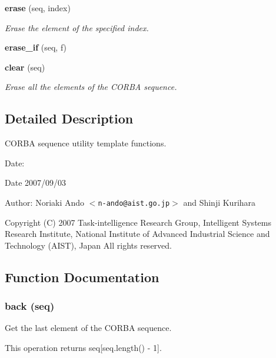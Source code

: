 \begin{CompactItemize}
{\bf erase} (seq, index)
\begin{CompactList}\small\item\em Erase the element of the specified index. \item\end{CompactList}\item 
{\bf erase\_\-if} (seq, f)
\item 
{\bf clear} (seq)
\begin{CompactList}\small\item\em Erase all the elements of the CORBA sequence. \item\end{CompactList}\end{CompactItemize}


\subsection{Detailed Description}
CORBA sequence utility template functions. 

\begin{Desc}
\item[Date:]\begin{Desc}
\item[Date]2007/09/03\end{Desc}
\end{Desc}
\begin{Desc}
\item[Author:]Noriaki Ando $<${\tt n-ando@aist.go.jp}$>$ and Shinji Kurihara\end{Desc}
Copyright (C) 2007 Task-intelligence Research Group, Intelligent Systems Research Institute, National Institute of Advanced Industrial Science and Technology (AIST), Japan All rights reserved.

\subsection{Function Documentation}
\subsubsection{\setlength{\rightskip}{0pt plus 5cm}back (seq)}\label{CORBA__SeqUtil_8py_a6}


Get the last element of the CORBA sequence. 

This operation returns seq[seq.length() - 1].

